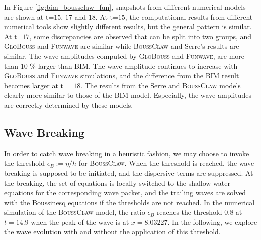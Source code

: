 \documentclass[review]{elsarticle}
\begin{document}
In Figure \ref{fig:bim_boussclaw_fun}, snapshots from different
numerical models are shown at t=$15$, $17$ and $18$. 
At t=$15$, the computational results
from different numerical tools show slightly different results,
but the general pattern is similar.
At t=$17$, some discrepancies are observed 
that can be split into two groups, and
\textsc{GloBouss} and \textsc{Funwave} 
are similar while \textsc{BoussClaw}
and Serre's results are similar. 
The wave amplitudes computed by \textsc{GloBouss} and \textsc{Funwave},
are more than 10 \% larger than BIM.
The wave amplitude continues to increase 
with \textsc{GloBouss} and \textsc{Funwave} simulations,
and the difference from the BIM result becomes larger at t = $18$. 
The results from the Serre and \textsc{BoussClaw} models clearly
more similar to those of the BIM model. 
Especially, the wave amplitudes are correctly determined by these models.

\subsection{Wave Breaking}

In order to catch wave breaking in a heuristic fashion,
we may choose to invoke the threshold $\epsilon_B:=\eta/h$ for \textsc{BoussClaw}.
When the threshold is reached, the wave breaking is supposed to be initiated, 
and the dispersive terms are suppressed. 
At the breaking, the set of equations is locally 
switched to the shallow water equations for the corresponding wave packet,
and the trailing waves are solved with the Boussinesq equations
if the thresholds are not reached. 
In the numerical simulation of the \textsc{BoussClaw} model,
the ratio $\epsilon_B$ reaches the threshold $0.8$ at $t=14.9$
when the peak of the wave is at $x=8.03227$.
In the following, we explore the wave evolution with and without
the application of this threshold.
\end{document}
